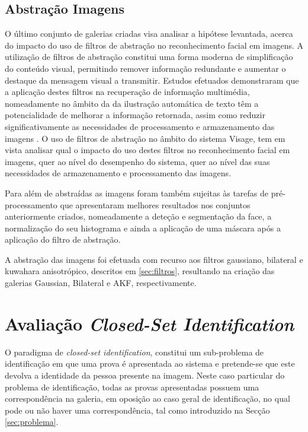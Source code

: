 \subsection{Abstração Imagens} \label{sec:pre-abstração}
O último conjunto de galerias criadas visa analisar a hipótese levantada, acerca do impacto do uso de filtros de abstração no reconhecimento facial em imagens. 
A utilização de filtros de abstração constitui uma forma moderna de simplificação do conteúdo visual, permitindo remover informação redundante e aumentar o destaque da mensagem visual a transmitir. Estudos efetuados demonstraram que a aplicação destes filtros na recuperação de informação multimédia, nomeadamente no âmbito da da ilustração automática de texto têm a potencialidade de melhorar a informação retornada, assim como reduzir significativamente as necessidades de processamento e armazenamento das imagens \cite{Coelho:2012:IAC:2260641.2260676}. O uso de filtros de abstração no âmbito do sistema Visage, tem em vista analisar qual o impacto do uso destes filtros no reconhecimento facial em imagens, quer ao nível do desempenho do sistema, quer ao nível das suas necessidades de armazenamento e processamento das imagens.

Para além de abstraídas as imagens foram também sujeitas às tarefas de pré-processamento que apresentaram melhores resultados nos conjuntos anteriormente criados, nomeadamente a deteção e segmentação da face, a normalização do seu histograma e ainda a aplicação de uma máscara após a aplicação do filtro de abstração.

A abstração das imagens foi efetuada com recurso aos filtros gaussiano, bilateral e kuwahara anisotrópico, descritos em \ref{sec:filtros}, resultando na criação das galerias Gaussian, Bilateral e AKF, respectivamente.

\section{Avaliação \textit{Closed-Set Identification}} \label{sec:avaliacao1}
O paradigma de \textit{closed-set identification}, constitui um sub-problema de identificação em que uma prova é apresentada ao sistema e pretende-se que este devolva a identidade da pessoa presente na imagem. Neste caso particular do problema de identificação, todas as provas apresentadas possuem uma correspondência na galeria, em oposição ao caso geral de identificação, no qual pode ou não haver uma correspondência, tal como introduzido na Secção \ref{sec:problema}.

